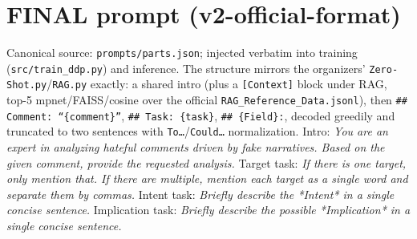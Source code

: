\documentclass[11pt]{article}
\begin{document}
\section{FINAL prompt (v2-official-format)}
\label{app:prompt}
Canonical source: \texttt{prompts/parts.json}; injected verbatim into training (\texttt{src/train\_ddp.py}) and inference. The structure mirrors the organizers' \texttt{Zero-Shot.py}/\texttt{RAG.py} exactly: a shared intro (plus a \texttt{[Context]} block under RAG, top-5 mpnet/FAISS/cosine over the official \texttt{RAG\_Reference\_Data.jsonl}), then \texttt{\#\# Comment: ``\{comment\}''}, \texttt{\#\# Task: \{task\}}, \texttt{\#\# \{Field\}:}, decoded greedily and truncated to two sentences with \texttt{To\ldots}/\texttt{Could\ldots} normalization.
Intro: \textit{You are an expert in analyzing hateful comments driven by fake narratives. Based on the given comment, provide the requested analysis.}
Target task: \textit{If there is one target, only mention that. If there are multiple, mention each target as a single word and separate them by commas.}
Intent task: \textit{Briefly describe the *Intent* in a single concise sentence.}
Implication task: \textit{Briefly describe the possible *Implication* in a single concise sentence.}


\end{document}
